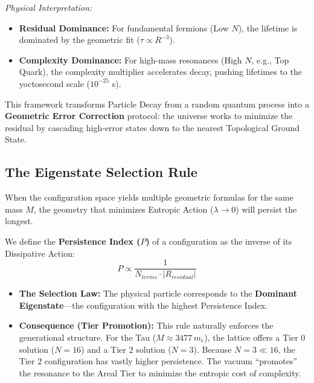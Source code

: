 \textit{Physical Interpretation:}
\begin{itemize}
    \item \textbf{Residual Dominance:} For fundamental fermions (Low $N$), the lifetime is dominated by the geometric fit ($\tau \propto R^{-3}$).
    \item \textbf{Complexity Dominance:} For high-mass resonances (High $N$, e.g., Top Quark), the complexity multiplier accelerates decay, pushing lifetimes to the yoctosecond scale ($10^{-25}$ s).
\end{itemize}

This framework transforms Particle Decay from a random quantum process into a \textbf{Geometric Error Correction} protocol: the universe works to minimize the residual by cascading high-error states down to the nearest Topological Ground State.

\subsection*{The Eigenstate Selection Rule}

When the configuration space yields multiple geometric formulas for the same mass $M$, the geometry that minimizes Entropic Action ($\lambda \to 0$) will persist the longest.

We define the \textbf{Persistence Index ($P$)} of a configuration as the inverse of its Dissipative Action:
\[ P \propto \frac{1}{N_{terms} \cdot |R_{residual}|} \]

\begin{itemize}
    \item \textbf{The Selection Law:} The physical particle corresponds to the \textbf{Dominant Eigenstate}—the configuration with the highest Persistence Index.
    \item \textbf{Consequence (Tier Promotion):} This rule naturally enforces the generational structure. For the Tau ($M \approx 3477 \, m_e$), the lattice offers a Tier 0 solution ($N=16$) and a Tier 2 solution ($N=3$). Because $N=3 \ll 16$, the Tier 2 configuration has vastly higher persistence. The vacuum ``promotes'' the resonance to the Areal Tier to minimize the entropic cost of complexity.
\end{itemize}